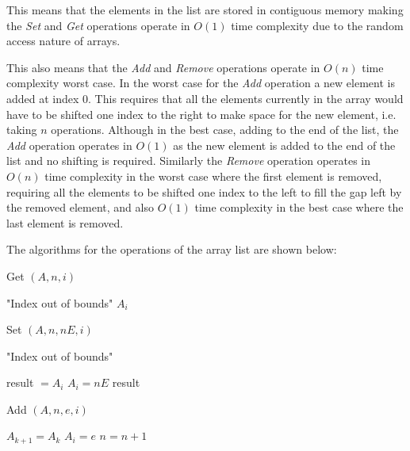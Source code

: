 \documentclass[12pt letter]{report}
\begin{document}
\noindent This means that the elements in the list are stored in contiguous
memory making the \textit{Set} and \textit{Get} operations operate in $O \left( 1 \right) $ time complexity due to the
random access nature of arrays.

\noindent This also means that the \textit{Add} and \textit{Remove} operations operate in $O \left( n \right) $ time
complexity worst case. In the worst case for the \textit{Add} operation a new element is added at index 0. This requires
that all the elements currently in the array would have to be shifted one index to the right to make space for the new
element, i.e. taking $n$ operations. Although in the best case, adding to the end of the list, the \textit{Add}
operation operates in $O \left( 1 \right) $ as the new element is added to the end of the list and no shifting is
required. Similarly the \textit{Remove} operation operates in $O \left( n \right) $ time complexity in the worst case
where the first element is removed, requiring all the elements to be shifted one index to the left to fill the gap left by
the removed element, and also $O \left( 1 \right) $ time complexity in the best case where the last element is removed.

\noindent The algorithms for the operations of the array list are shown below:
\begin{algorithm}[H]
  \caption{Get $ \left( A, n, i \right) $}
  \begin{algorithmic}[1]
     
    \State \Return "Index out of bounds"
    \EndIf
    \State \Return $A_i$
  \end{algorithmic}
\end{algorithm}

\begin{algorithm}[H]
  \caption{Set $ \left( A, n, nE, i \right) $}
  \begin{algorithmic}[1]
     
    \State \Return "Index out of bounds"
    \EndIf

    \State result $ = A_i$
    \State $A_i = nE$
    \State \Return result
  \end{algorithmic}
\end{algorithm}

\begin{algorithm}[H]
  \caption{Add $ \left( A, n, e, i \right) $}
  \begin{algorithmic}[1]
     

    $A_{k+1} = A_{k}$ 
    \EndFor
    \State $A_{i} = e$ 
    \State $n = n + 1$
  \end{algorithmic}
\end{algorithm}
\end{document}
